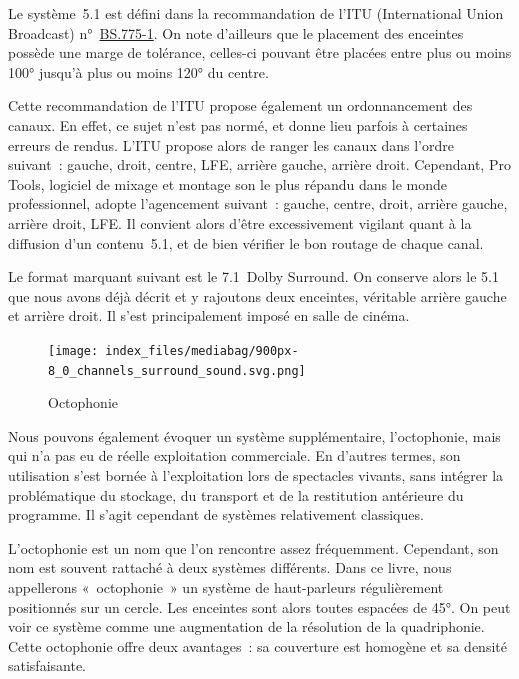 \documentclass[
  letterpaper,
  DIV=11,
  numbers=noendperiod]{scrreprt}
\begin{document}
Le système~5.1 est défini dans la recommandation de l'ITU (International
Union Broadcast)
n°~\href{https://www.itu.int/rec/R-REC-BS.775/}{BS.775-1}. On note
d'ailleurs que le placement des enceintes possède une marge de
tolérance, celles-ci pouvant être placées entre plus ou moins 100°
jusqu'à plus ou moins 120° du centre.

Cette recommandation de l'ITU propose également un ordonnancement des
canaux. En effet, ce sujet n'est pas normé, et donne lieu parfois à
certaines erreurs de rendus. L'ITU propose alors de ranger les canaux
dans l'ordre suivant~: gauche, droit, centre, LFE, arrière gauche,
arrière droit. Cependant, Pro Tools, logiciel de mixage et montage son
le plus répandu dans le monde professionnel, adopte l'agencement
suivant~: gauche, centre, droit, arrière gauche, arrière droit, LFE. Il
convient alors d'être excessivement vigilant quant à la diffusion d'un
contenu~5.1, et de bien vérifier le bon routage de chaque canal.

Le format marquant suivant est le 7.1~Dolby Surround. On conserve alors
le 5.1 que nous avons déjà décrit et y rajoutons deux enceintes,
véritable arrière gauche et arrière droit. Il s'est principalement
imposé en salle de cinéma.

\begin{figure}

{\centering \texttt{[image: index\_files/mediabag/900px-8\_0\_channels\_surround\_sound.svg.png]}

}

\caption{Octophonie}

\end{figure}

Nous pouvons également évoquer un système supplémentaire, l'octophonie,
mais qui n'a pas eu de réelle exploitation commerciale. En d'autres
termes, son utilisation s'est bornée à l'exploitation lors de spectacles
vivants, sans intégrer la problématique du stockage, du transport et de
la restitution antérieure du programme. Il s'agit cependant de systèmes
relativement classiques.

L'octophonie est un nom que l'on rencontre assez fréquemment. Cependant,
son nom est souvent rattaché à deux systèmes différents. Dans ce livre,
nous appellerons «~octophonie~» un système de haut-parleurs
régulièrement positionnés sur un cercle. Les enceintes sont alors toutes
espacées de 45°. On peut voir ce système comme une augmentation de la
résolution de la quadriphonie. Cette octophonie offre deux avantages~:
sa couverture est homogène et sa densité satisfaisante.
\end{document}
